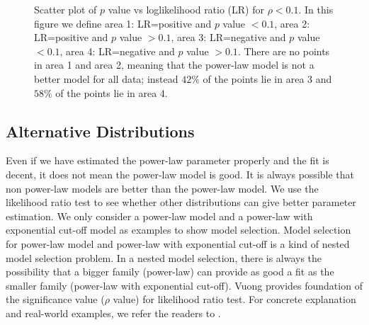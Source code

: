 \documentclass[10pt,conference,letterpaper,final]{IEEEtran}
\begin{document}
\begin{figure}
\centering
{}
\caption{Scatter plot of $p$ value vs loglikelihood ratio (LR) for $\rho < 0.1$. In this figure we define area 1: LR=positive and $p$ value $<0.1$, area 2: LR=positive and $p$ value $>0.1$, area 3: LR=negative and $p$ value $<0.1$, area 4: LR=negative and $p$ value $>0.1$. There are no points in area 1 and area 2, meaning that the power-law model is not a better model for all data; instead $42\%$ of the points lie in area 3 and $58\%$ of the points lie in area 4.} 
\label{fig:scatter-pvalue-vs-lr-for-rho-le-01}
\vspace{-2mm}
\end{figure}


\subsection{Alternative Distributions}
Even if we have estimated the power-law parameter properly and the fit is decent, it does not mean the power-law model is good.
It is always possible that non power-law models are better than the power-law model.
We use the likelihood ratio test \cite{vuong1989likelihood} to see whether other distributions can give better parameter estimation.
We only consider a power-law model and a power-law with exponential cut-off model as examples to show model selection.
Model selection for power-law model and power-law with exponential cut-off is a kind of nested model selection problem. 
In a nested model selection,  there is always the possibility that a bigger family (power-law) can provide as good a fit as the smaller family (power-law with exponential cut-off). 
Vuong \cite{vuong1989likelihood} provides foundation of the significance value ($\rho$ value) for likelihood ratio test. 
For concrete explanation and real-world examples, we refer the readers to \cite{clauset2009power}.
\end{document}
